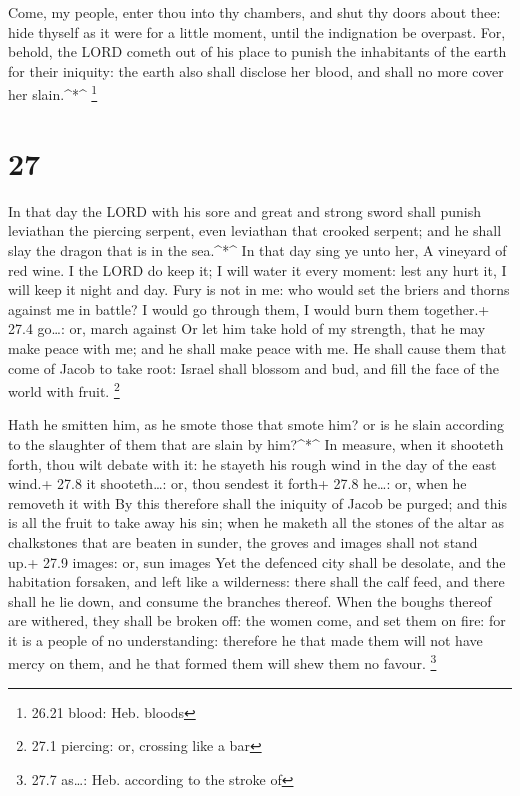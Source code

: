  Come, my people, enter thou into thy chambers, and shut
thy doors about thee: hide thyself as it were for a little moment, until
the indignation be overpast.  For, behold, the LORD cometh
out of his place to punish the inhabitants of the earth for their
iniquity: the earth also shall disclose her blood, and shall no more
cover her slain.\^{}*\^{} \footnote{26.21 blood: Heb. bloods}

\hypertarget{section-26}{%
\section{27}\label{section-26}}

 In that day the LORD with his sore and great and strong
sword shall punish leviathan the piercing serpent, even leviathan that
crooked serpent; and he shall slay the dragon that is in the
sea.\^{}*\^{}  In that day sing ye unto her, A vineyard of
red wine.  I the LORD do keep it; I will water it every
moment: lest any hurt it, I will keep it night and day. 
Fury is not in me: who would set the briers and thorns against me in
battle? I would go through them, I would burn them together.+ 27.4
go\ldots: or, march against  Or let him take hold of my
strength, that he may make peace with me; and he shall make peace with
me.  He shall cause them that come of Jacob to take root:
Israel shall blossom and bud, and fill the face of the world with fruit.
\footnote{27.1 piercing: or, crossing like a bar}

 Hath he smitten him, as he smote those that smote him? or
is he slain according to the slaughter of them that are slain by
him?\^{}*\^{}  In measure, when it shooteth forth, thou wilt
debate with it: he stayeth his rough wind in the day of the east wind.+
27.8 it shooteth\ldots: or, thou sendest it forth+ 27.8 he\ldots: or,
when he removeth it with  By this therefore shall the
iniquity of Jacob be purged; and this is all the fruit to take away his
sin; when he maketh all the stones of the altar as chalkstones that are
beaten in sunder, the groves and images shall not stand up.+ 27.9
images: or, sun images  Yet the defenced city shall be
desolate, and the habitation forsaken, and left like a wilderness: there
shall the calf feed, and there shall he lie down, and consume the
branches thereof.  When the boughs thereof are withered,
they shall be broken off: the women come, and set them on fire: for it
is a people of no understanding: therefore he that made them will not
have mercy on them, and he that formed them will shew them no favour.
\footnote{27.7 as\ldots: Heb. according to the stroke of}

